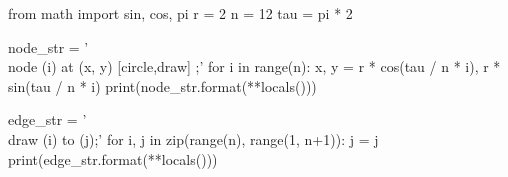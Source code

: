 \begin{python}
from math import sin, cos, pi
r = 2
n = 12
tau = pi * 2

node_str = '\\node ({i}) at ({x}, {y}) [circle,draw] {{}};\n'
for i in range(n):
    x, y = r * cos(tau / n * i), r * sin(tau / n * i)
    print(node_str.format(**locals()))

edge_str = '\\draw ({i}) to ({j});\n'
for i, j in zip(range(n), range(1, n+1)):
    j = j %
    print(edge_str.format(**locals()))

\end{python}

